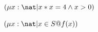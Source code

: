 \documentclass[a4paper,10pt,fleqn]{article}
\begin{document}
\noindent
$(\mu x : \nat | x * x = 4 \land x > 0)$


\noindent
$(\mu x : \nat | x \in S @ f(x))$
\end{document}

